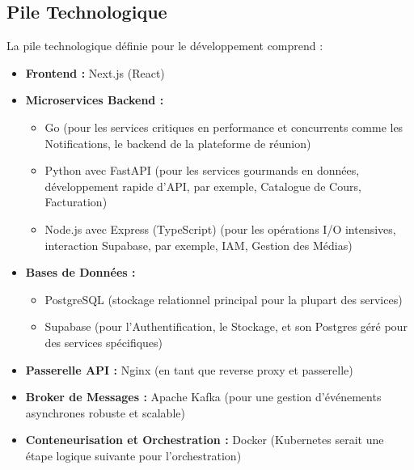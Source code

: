 \subsection{Pile Technologique}
La pile technologique définie pour le développement comprend :
\begin{itemize}
  \item \textbf{Frontend :} Next.js (React)
  \item \textbf{Microservices Backend :}
    \begin{itemize}
      \item Go (pour les services critiques en performance et concurrents comme les Notifications, le backend de la plateforme de réunion)
      \item Python avec FastAPI (pour les services gourmands en données, développement rapide d'API, par exemple, Catalogue de Cours, Facturation)
      \item Node.js avec Express (TypeScript) (pour les opérations I/O intensives, interaction Supabase, par exemple, IAM, Gestion des Médias)
    \end{itemize}
  \item \textbf{Bases de Données :}
    \begin{itemize}
      \item PostgreSQL (stockage relationnel principal pour la plupart des services)
      \item Supabase (pour l'Authentification, le Stockage, et son Postgres géré pour des services spécifiques)
    \end{itemize}
  \item \textbf{Passerelle API :} Nginx (en tant que reverse proxy et passerelle)
  \item \textbf{Broker de Messages :} Apache Kafka (pour une gestion d'événements asynchrones robuste et scalable)
  \item \textbf{Conteneurisation et Orchestration :} Docker (Kubernetes serait une étape logique suivante pour l'orchestration)
\end{itemize}

